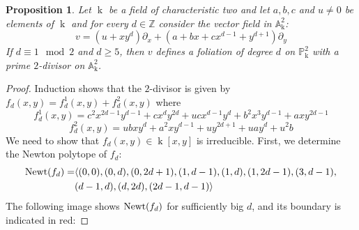 \documentclass[reqno,oneside,11pt]{amsart}
\newtheorem{prop}[thm]{Proposition}
\theoremstyle{definition}
\DeclareMathOperator{\field}{k}
\begin{document}
\begin{prop}\label{invII} Let $\field$ be a field of characteristic two and let $a,b,c$ and $u\neq 0$ be elements of $\field$ and for every $d \in \mathbb{Z}$ consider the vector field in $\mathbb{A}_{\field}^{2}$:
$$
    v = (u+xy^{d})\partial_x+(a+bx+cx^{d-1}+y^{d+1})\partial_{y}
$$
If $d \equiv 1 \mod 2$ and $d \geq 5$, then $v$ defines a foliation of degree $d$ on $\mathbb{P}_{\field}^{2}$ with a prime $2$-divisor on $\mathbb{A}^2_{\field}$. 
\end{prop}
\begin{proof} Induction shows that the $2$-divisor is given by $f_{d}(x,y) = f_{d}^{1}(x,y)+f_{d}^{2}(x,y)$ where 
$$
    f_{d}^{1}(x,y) = c^2x^{2d-1}y^{d-1}+cx^{d}y^{2d}+ucx^{d-1}y^{d}+b^{2}x^{3}y^{d-1}+axy^{2d-1}
$$
$$
    f_{d}^{2}(x,y) = ubxy^{d}+a^{2}xy^{d-1}+uy^{2d+1}+uay^{d}+u^2b
$$
We need to show that $f_{d}(x,y) \in \field[x,y]$ is irreducible. First, we determine the Newton polytope of $f_d$:
\begin{align*}{\rm Newt}(f_d)   = & \langle (0,0), (0,d), (0,2d+1), (1,d-1), (1,d), (1,2d-1), (3,d-1), \\ & (d-1,d), (d,2d), (2d-1,d-1)\rangle\end{align*}
The following image shows ${\rm Newt}(f_d)$ for sufficiently big $d$, and its boundary is indicated in red:



\end{proof}
\end{document}
